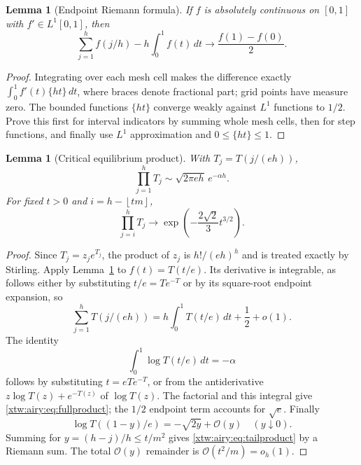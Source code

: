 \documentclass[11pt]{article}
\newtheorem{lemma}[theorem]{Lemma}
\theoremstyle{remark}\newtheorem{remark}[theorem]{Remark}
\newcommand{\OO}{\mathcal O}
\newcommand{\floor}[1]{\left\lfloor #1\right\rfloor}
\begin{document}
\begin{lemma}[Endpoint Riemann formula]\label{xtw:airy:lem:endpoint}
If $f$ is absolutely continuous on $[0,1]$ with $f'\in L^1[0,1]$, then
\begin{equation}\label{xtw:airy:eq:riemann}
 \sum_{j=1}^h f(j/h)-h\int_0^1f(t)\,dt
 \longrightarrow\frac{f(1)-f(0)}2.
\end{equation}
\end{lemma}
\begin{proof}
Integrating over each mesh cell makes the difference exactly
$\int_0^1 f'(t)\{ht\}\,dt$, where braces denote fractional part; grid points
have measure zero. The bounded functions $\{ht\}$ converge weakly against
$L^1$ functions to $1/2$. Prove this first for interval indicators by summing
whole mesh cells, then for step functions, and finally use $L^1$
approximation and $0\le\{ht\}\le1$.
\end{proof}

\begin{lemma}[Critical equilibrium product]\label{xtw:airy:lem:product}
With $T_j=T(j/(eh))$,
\begin{equation}\label{xtw:airy:eq:fullproduct}
 \prod_{j=1}^hT_j\sim\sqrt{2\pi e h}\,e^{-\alpha h}.
\end{equation}
For fixed $t>0$ and $i=h-\floor{tm}$,
\begin{equation}\label{xtw:airy:eq:tailproduct}
 \prod_{j=i}^hT_j\longrightarrow
 \exp\!\left(-\frac{2\sqrt2}{3}t^{3/2}\right).
\end{equation}
\end{lemma}
\begin{proof}
Since $T_j=z_je^{T_j}$, the product of $z_j$ is $h!/(eh)^h$ and is treated
exactly by Stirling. Apply Lemma~\ref{xtw:airy:lem:endpoint} to $f(t)=T(t/e)$.
Its derivative is integrable, as follows either by substituting $t/e=Te^{-T}$
or by its square-root endpoint expansion, so
\[
 \sum_{j=1}^hT(j/(eh))=h\int_0^1T(t/e)\,dt+\frac12+o(1).
\]
The identity
\begin{equation}\label{xtw:airy:eq:logTintegral}
 \int_0^1\log T(t/e)\,dt=-\alpha
\end{equation}
follows by substituting $t=eTe^{-T}$, or from the antiderivative
$z\log T(z)+e^{-T(z)}$ of $\log T(z)$. The factorial and this integral give
\eqref{xtw:airy:eq:fullproduct}; the $1/2$ endpoint term accounts for $\sqrt e$.
Finally
\[
 \log T((1-y)/e)=-\sqrt{2y}+\OO(y)\quad(y\downarrow0).
\]
Summing for $y=(h-j)/h\le t/m^2$ gives \eqref{xtw:airy:eq:tailproduct} by a Riemann
sum. The total $\OO(y)$ remainder is $\OO(t^2/m)=o_h(1)$.
\end{proof}
\end{document}

